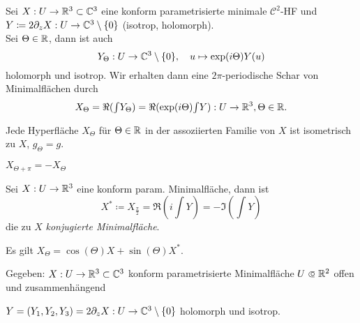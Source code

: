 \documentclass{cheat-sheet}
\newcommand{\Cont}{\mathcal{C}} %
\begin{document}



\begin{defn}
  Sei $X : U \to \mathbb{R}^3 \subset \mathbb{C}^3$ eine konform parametrisierte minimale $\Cont^2$-HF und $Y \coloneqq 2 \partial_z X : U \to \mathbb{C}^3 \setminus \{ 0 \}$ (isotrop, holomorph). \\
  Sei $\Theta \in \mathbb{R}$, dann ist auch
  \[ Y_\Theta : U \to \mathbb{C}^3 \setminus \{ 0 \}, \quad u \mapsto \exp(i \Theta) Y(u) \]
  holomorph und isotrop. Wir erhalten dann eine $2 \pi$-periodische Schar von Minimalflächen durch
  \[ X_{\Theta} = \Re ({\textstyle \int} Y_{\Theta}) = \Re (\exp(i \Theta) {\textstyle \int} Y) : U \to \mathbb{R}^3, \Theta \in \mathbb{R}. \]
\end{defn}

\begin{lem}
  Jede Hyperfläche $X_\Theta$ für $\Theta \in \mathbb{R}$ in der assoziierten Familie von $X$ ist isometrisch zu $X$, \dh{} $g_{\Theta} = g$.
\end{lem}

\begin{beob}
  $X_{\Theta + \pi} = - X_{\Theta}$
\end{beob}

\begin{defn}
  Sei $X : U \to \mathbb{R}^3$ eine konform param. Minimalfläche, dann ist
  \[ X^* \coloneqq X_{\tfrac{\pi}{2}} = \Re (i {\textstyle \int} Y) = - \Im ({\textstyle \int} Y) \]
  die zu $X$ \emph{konjugierte Minimalfläche}.
\end{defn}

\begin{beob}
  Es gilt $X_{\Theta} = \cos(\Theta) X + \sin(\Theta) X^*$.
\end{beob}


\iffalse
  Gegeben: $X : U \to \mathbb{R}^3 \subset \mathbb{C}^3$ konform parametrisierte Minimalfläche
  $U \opn \R^2$ offen und zusammenhängend

  $Y = (Y_1, Y_2, Y_3) = 2 \partial_z X : U \to \mathbb{C}^3 \setminus \{0\}$ holomorph und isotrop.
\end{document}
